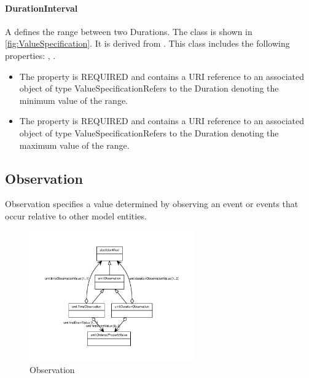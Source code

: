 \paragraph{DurationInterval}%
\label{sec:uml:DurationInterval}%
A  defines the range between two Durations.%
\newline%
\linebreak%
The  class is shown in \ref{fig:ValueSpecification}. It is derived from .%
This class includes the following properties: , . %
\begin{itemize}%
\item%
The  property is REQUIRED and contains a URI reference to an associated object of type ValueSpecificationRefers to the Duration denoting the minimum value of the range.%
\item%
The  property is REQUIRED and contains a URI reference to an associated object of type ValueSpecificationRefers to the Duration denoting the maximum value of the range.%
\end{itemize}%
\subsection{Observation}%
\label{sec:uml:Observation}%
Observation specifies a value determined by observing an event or events that occur relative to other model entities.%
\newline%
\linebreak%


\begin{figure}[h!]%
\centering%
\includegraphics[width=0.634468085106383\textwidth]{uml_classes/Observation_abstraction_hierarchy.pdf}%
\caption{Observation}%
\label{fig:Observation}%
\end{figure}

